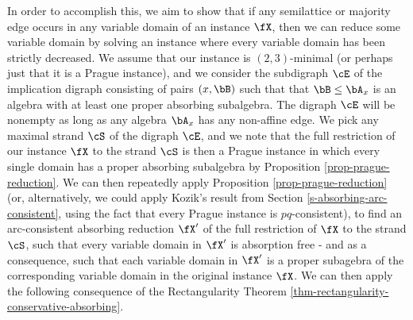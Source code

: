 In order to accomplish this, we aim to show that if any semilattice or majority edge occurs in any variable domain of an instance $\fX$, then we can reduce some variable domain by solving an instance where every variable domain has been strictly decreased. We assume that our instance is $(2,3)$-minimal (or perhaps just that it is a Prague instance), and we consider the subdigraph $\cE$ of the implication digraph consisting of pairs $(x,\bB)$ such that that $\bB \le \bA_x$ is an algebra with at least one proper absorbing subalgebra. The digraph $\cE$ will be nonempty as long as any algebra $\bA_x$ has any non-affine edge. We pick any maximal strand $\cS$ of the digraph $\cE$, and we note that the full restriction of our instance $\fX$ to the strand $\cS$ is then a Prague instance in which every single domain has a proper absorbing subalgebra by Proposition \ref{prop-prague-reduction}. We can then repeatedly apply Proposition \ref{prop-prague-reduction} (or, alternatively, we could apply Kozik's \cite{pq-consistency} result from Section \ref{s-absorbing-arc-consistent}, using the fact that every Prague instance is $pq$-consistent), to find an arc-consistent absorbing reduction $\fX'$ of the full restriction of $\fX$ to the strand $\cS$, such that every variable domain in $\fX'$ is absorption free - and as a consequence, such that each variable domain in $\fX'$ is a proper subagebra of the corresponding variable domain in the original instance $\fX$. We can then apply the following consequence of the Rectangularity Theorem \ref{thm-rectangularity-conservative-absorbing}.

